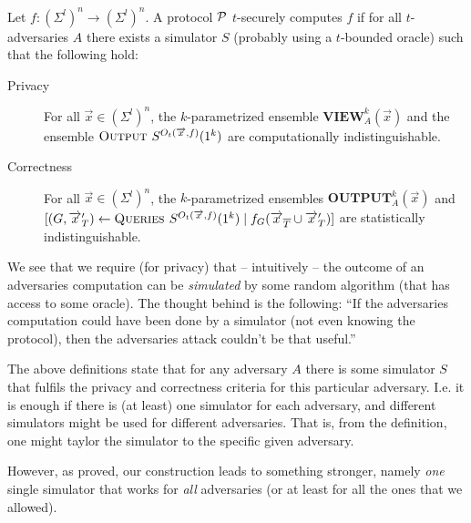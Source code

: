\message{ !name(seminar.tex)}\documentclass{llncs}
\newcommand{\todo}[1]{ {\color{red}{\textbf{#1}}}}
\begin{document}
\begin{definition}
  Let $f:(\Sigma^l)^n\rightarrow(\Sigma^l)^n$. A protocol ${\cal P}$ $t$-securely computes $f$ if for all $t$-adversaries $A$ there exists a simulator $S$ (probably using a $t$-bounded oracle) such that the following hold:
  \begin{description}
  \item[Privacy] For all $\overrightarrow{x}\in(\Sigma^l)^n$, the $k$-parametrized ensemble $\mathbf{VIEW}_A^k(\overrightarrow{x})$ and the ensemble $\textsc{Output } S^{O_t(\overrightarrow{x},f)}(1^k)$ are computationally indistinguishable.
  \item[Correctness] For all $\overrightarrow{x}\in(\Sigma^l)^n$, the $k$-parametrized ensembles $\mathbf{OUTPUT}_A^k(\overrightarrow{x})$ and $[(G,\overrightarrow{x}'_T) \leftarrow \textsc{Queries } S^{O_t(\overrightarrow{x},f)}(1^k)\mid f_G(\overrightarrow{x}_{\overline{T}}\cup\overrightarrow{x}'_T)]$ are statistically indistinguishable.
  \end{description}
\end{definition}

We see that we require (for privacy) that -- intuitively -- the outcome of an adversaries computation can be \emph{simulated} by some random algorithm (that has access to some oracle). The thought behind is the following: ``If the adversaries computation could have been done by a simulator (not even knowing the protocol), then the adversaries attack couldn't be that useful.''

The above definitions state that for any adversary $A$ there is some simulator $S$ that fulfils the privacy and correctness criteria for this particular adversary. I.e. it is enough if there is (at least) one simulator for each adversary, and different simulators might be used for different adversaries. That is, from the definition, one might taylor the simulator to the specific given adversary.

However, as \cite{Rogaway:1991:RCS:888502} proved, our construction leads to something stronger, namely \emph{one} single simulator that works for \emph{all} adversaries (or at least for all the ones that we allowed). %
\end{document}
